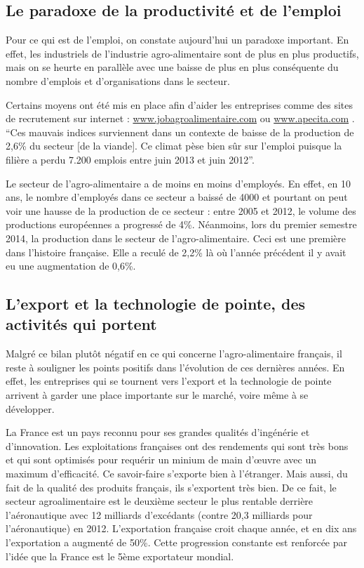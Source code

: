 \documentclass[a4paper,12pt]{report}
\begin{document}
		\subsection{Le paradoxe de la productivité et de l'emploi}
			Pour ce qui est de l’emploi, on constate aujourd'hui un paradoxe important. En effet, les industriels de l’industrie agro-alimentaire sont de plus en plus productifs, mais on se heurte en parallèle avec une baisse de plus en plus conséquente du nombre d’emplois et d’organisations dans le secteur.
			
			Certains moyens ont été mis en place afin d’aider les entreprises comme des sites de recrutement sur internet : \url{www.jobagroalimentaire.com} ou \url{www.apecita.com} .  “Ces mauvais indices surviennent dans un contexte de baisse de la production de 2,6\% du secteur [de la viande]. Ce climat pèse bien sûr sur l'emploi puisque la filière a perdu 7.200 emplois entre juin 2013 et juin 2012”\cite{DeficitCommercialViandeAggrave}.
			
			Le secteur de l’agro-alimentaire a de moins en moins d’employés. En effet, en 10 ans, le nombre d’employés dans ce secteur a baissé de 4000\cite{IAAHeritageAgricoleBretagne} et pourtant on peut voir une hausse de la production de ce secteur : entre 2005 et 2012, le volume des productions européennes a progressé de 4\%\cite{HausseModereeVenteProduitsAA2012}. Néanmoins, lors du premier semestre 2014, la production dans le secteur de l’agro-alimentaire. Ceci est une première dans l’histoire française. Elle a reculé de 2,2\% là où l’année précédent il y avait eu une augmentation de 0,6\%\cite{ReculHistoriqueProductionAAFrance}.
			

		\subsection{L'export et la technologie de pointe, des activités qui portent}
			Malgré ce bilan plutôt négatif en ce qui concerne l’agro-alimentaire français, il reste à souligner les points positifs dans l’évolution de ces dernières années. En effet, les entreprises qui se tournent vers l’export et la technologie de pointe arrivent à garder une place importante sur le marché, voire même à se développer.
			
			La France est un pays reconnu pour ses grandes qualités d’ingénérie et d’innovation. Les exploitations françaises ont des rendements qui sont très bons et qui sont optimisés pour requérir un minium de main d'œuvre avec un maximum d’efficacité. Ce savoir-faire s’exporte bien à l’étranger. Mais aussi, du fait de la qualité des produits français, ils s’exportent très bien. De ce fait, le secteur agroalimentaire est le deuxième secteur le plus rentable derrière l’aéronautique avec 12 milliards d’excédants (contre 20,3 milliards pour l’aéronautique) en 2012\cite{AAExport2014}. L’exportation française croit chaque année, et en dix ans l’exportation a augmenté de 50\%. Cette progression constante est renforcée par l’idée que la France est le 5ème exportateur mondial.
\end{document}

